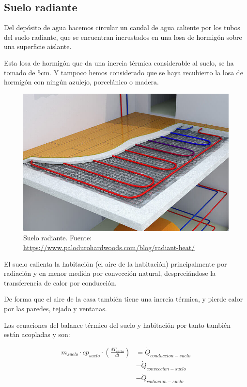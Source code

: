 \subsection{Suelo radiante}

Del depósito de agua hacemos circular un caudal de agua caliente por los
tubos del suelo radiante, que se encuentran incrustados en una losa de hormigón
sobre una superficie aislante.

Esta losa de hormigón que da una inercia térmica considerable al suelo, se ha
tomado de 5cm. Y tampoco hemos considerado que se haya recubierto la losa de
hormigón con ningún azulejo, porcelánico o madera.

\begin{figure}[h] \centering
	\centering
	\includegraphics[width=1\textwidth]{./capitulos/resultados_discusion/images/radiant_heating_floor.jpg}
	\caption{Suelo radiante. Fuente: \url{https://www.palodurohardwoods.com/blog/radiant-heat/}}
	\label{fig:radiant_heating_floor}
\end{figure}

El suelo calienta la habitación (el aire de la habitación) principalmente por
radiación y en menor medida por convección natural, despreciándose la
transferencia de calor por conducción.

De forma que el aire de la casa también tiene una inercia térmica, y pierde
calor por las paredes, tejado y ventanas.

Las ecuaciones del balance térmico del suelo y habitación por tanto también
están acopladas y son:

\begin{align} \label{eq:floor_energy_conservation}
	m_{suelo} \cdot cp_{suelo} \cdot \left( \frac{dT_{suelo}}{dt} \right) & = \dot{Q}_{conduccion-suelo} \nonumber \\
	                                                                      & - \dot{Q}_{conveccion-suelo} \nonumber \\
	                                                                      & - \dot{Q}_{radiacion-suelo}
\end{align}

